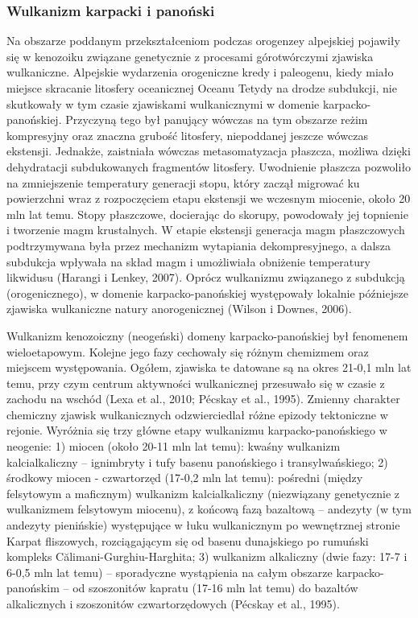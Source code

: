 \documentclass[11.5pt,twoside]{report}
\begin{document}
	\subsubsection{Wulkanizm karpacki i panoński}

Na obszarze poddanym przekształceniom podczas orogenzey alpejskiej pojawiły się w kenozoiku związane genetycznie z procesami górotwórczymi zjawiska wulkaniczne. Alpejskie wydarzenia orogeniczne kredy i paleogenu, kiedy miało miejsce skracanie litosfery oceanicznej Oceanu Tetydy na drodze subdukcji, nie skutkowały w tym czasie zjawiskami wulkanicznymi w domenie karpacko-panońskiej. Przyczyną tego był panujący wówczas na tym obszarze reżim kompresyjny oraz znaczna grubość litosfery, niepoddanej jeszcze wówczas ekstensji. Jednakże, zaistniała wówczas metasomatyzacja płaszcza, możliwa dzięki dehydratacji subdukowanych fragmentów litosfery. Uwodnienie płaszcza pozwoliło na zmniejszenie temperatury generacji stopu, który zaczął migrować ku powierzchni wraz z rozpoczęciem etapu ekstensji we wczesnym miocenie, około 20 mln lat temu. Stopy płaszczowe, docierając do skorupy, powodowały jej topnienie i tworzenie magm krustalnych. W etapie ekstensji generacja magm płaszczowych podtrzymywana była przez mechanizm wytapiania dekompresyjnego, a dalsza subdukcja wpływała na skład magm i umożliwiała obniżenie temperatury likwidusu (Harangi i Lenkey, 2007). Oprócz wulkanizmu związanego z subdukcją (orogenicznego), w domenie karpacko-panońskiej występowały lokalnie pó\'{z}niejsze zjawiska wulkaniczne natury anorogenicznej (Wilson i Downes, 2006).


Wulkanizm kenozoiczny (neogeński) domeny karpacko-panońskiej był fenomenem wieloetapowym. Kolejne jego fazy cechowały się różnym chemizmem oraz miejscem występowania. Ogółem, zjawiska te datowane są na okres 21-0,1 mln lat temu, przy czym centrum aktywności wulkanicznej przesuwało się w czasie z zachodu na wschód (Lexa et al., 2010; P\'{e}cskay et al., 1995). Zmienny charakter chemiczny zjawisk wulkanicznych odzwierciedlał różne epizody tektoniczne w rejonie. Wyróżnia się trzy główne etapy wulkanizmu karpacko-panońskiego w neogenie: 1) miocen (około 20-11 mln lat temu): kwaśny wulkanizm kalcialkaliczny -- ignimbryty i tufy basenu panońskiego i transylwańskiego; 2) środkowy miocen - czwartorzęd (17-0,2 mln lat temu): pośredni (między felsytowym a maficznym) wulkanizm kalcialkaliczny (niezwiązany genetycznie z wulkanizmem felsytowym miocenu), z końcową fazą bazaltową -- andezyty (w tym andezyty pienińskie) występujące w łuku wulkanicznym po wewnętrznej stronie Karpat fliszowych, rozciągającym się od basenu dunajskiego po rumuński kompleks Călimani-Gurghiu-Harghita; 3) wulkanizm alkaliczny (dwie fazy: 17-7 i 6-0,5 mln lat temu) -- sporadyczne wystąpienia na całym obszarze karpacko-panońskim -- od szoszonitów kapratu (17-16 mln lat temu) do bazaltów alkalicznych i szoszonitów czwartorzędowych (P\'{e}cskay et al., 1995).
  
\end{document}
